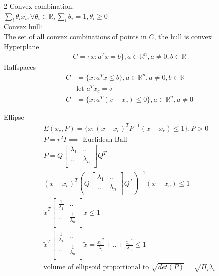 \documentclass[8pt]{extarticle}
\newcommand{\R}{\mathbb{R}}
\begin{document}
\begin{multicols*}{2}
  Convex combination:\\
  $\sum_i \theta_i x_i, \forall \theta_i \in \R, \sum_i \theta_i = 1, \theta_i \geq 0$\\
  
  Convex hull:\\
  The set of all convex combinations of points in $C$, the hull is convex\\

  Hyperplane
  \begin{align*}
    C=\{x: a^Tx=b\}, a \in \R^n, a \neq 0, b \in \R
  \end{align*}
  Halfspaces
  \begin{align*}
    C&=\{x: a^Tx \leq b\}, a \in \R^n, a \neq 0, b \in \R\\
     &\text{let } a^Tx_c=b\\
    C&=\{x: a^T(x-x_c) \leq 0\}, a \in \R^n, a \neq 0
  \end{align*}
  
  Ellipse
  \begin{align*}
    E(x_c,P) = \{ x: (x-x_c)^T P^{-1} (x-x_c) \leq 1 \}, P > 0\\
    P=r^2 I \implies \text{ Euclidean Ball }\\
    P=Q \begin{bmatrix}
      \lambda_1 & ..\\
      .. & \lambda_n\\
    \end{bmatrix}
    Q^T\\
    (x-x_c)^T (Q \begin{bmatrix}
      \lambda_1 & ..\\
      .. & \lambda_n\\
    \end{bmatrix}
    Q^T)^{-1}(x-x_c) \leq 1\\
    \tilde{x}^T \begin{bmatrix}
      \frac{1}{\lambda_1} & ..\\
      .. & \frac{1}{\lambda_n}\\
    \end{bmatrix}
    \tilde{x} \leq 1\\
    \tilde{x}^T \begin{bmatrix}
      \frac{1}{\lambda_1} & ..\\
      .. & \frac{1}{\lambda_n}\\
    \end{bmatrix}
    \tilde{x} = \frac{\tilde{x_1}^2}{\lambda_1}+..+\frac{\tilde{x_n}^2}{\lambda_n}\leq 1\\
    \text{volume of ellipsoid proportional to } \sqrt{det(P)}=\sqrt{\Pi_i \lambda_i}
  \end{align*}
  

\end{multicols*}
\end{document}
